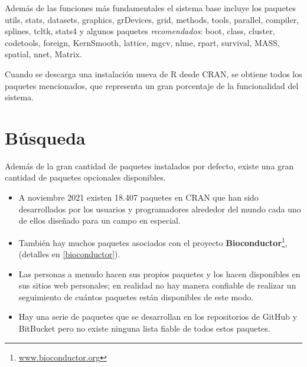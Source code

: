 \documentclass[
]{book}
\providecommand{\tightlist}{%
  \setlength{\itemsep}{0pt}\setlength{\parskip}{0pt}}
\begin{document}
Además de las funciones más fundamentales el sistema base incluye los paquetes
utils, stats, datasets, graphics, grDevices, grid, methods, tools, parallel, compiler, splines, tcltk, stats4 y algunos paquetes \emph{recomendados}: boot, class, cluster, codetools, foreign, KernSmooth, lattice, mgcv, nlme, rpart, survival, MASS, spatial, nnet, Matrix.

Cuando se descarga una instalación nueva de R desde CRAN, se obtiene todos los paquetes mencionados, que representa un gran porcentaje de la funcionalidad del sistema.

\hypertarget{pack-search}{%
\section{Búsqueda}\label{pack-search}}

Además de la gran cantidad de paquetes instalados por defecto, existe una gran cantidad de paquetes opcionales disponibles.

\begin{itemize}
\tightlist
\item
  A noviembre 2021 existen 18.407 paquetes en CRAN que han sido desarrollados por los usuarios y programadores alrededor del mundo cada uno de ellos diseñado para un campo en especial.
\item
  También hay muchos paquetes asociados con el proyecto \textbf{Bioconductor}\footnote{\href{https://www.bioconductor.org/}{www.bioconductor.org}}, (detalles en \ref{bioconductor}).
\item
  Las personas a menudo hacen sus propios paquetes y los hacen disponibles en sus sitios web personales; en realidad no hay manera confiable de realizar un seguimiento de cuántos paquetes están disponibles de este modo.
\item
  Hay una serie de paquetes que se desarrollan en los repositorios de GitHub y BitBucket pero no existe ninguna lista fiable de todos estos paquetes.
\end{itemize}
\end{document}

